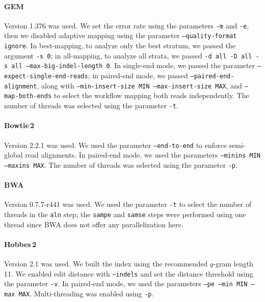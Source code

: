 \paragraph{GEM}
Version 1.376 was used.
We set the error rate using the parameters \texttt{-m} and \texttt{-e}, then we disabled adaptive mapping using the parameter \texttt{--quality-format ignore}.
In best-mapping, to analyze only the best stratum, we passed the argument \texttt{-s 0};
in all-mapping, to analyze all strata, we passed \texttt{-d all -D all -s all --max-big-indel-length 0}.
In single-end mode, we passed the parameter \texttt{--expect-single-end-reads}; in paired-end mode, we passed \texttt{--paired-end-alignment}, along with \texttt{--min-insert-size MIN --max-insert-size MAX}, and \texttt{--map-both-ends} to select the workflow mapping both reads independently.
The number of threads was selected using the parameter \texttt{-t}.

\paragraph{Bowtie\,2}
Version 2.2.1 was used.
We used the parameter \texttt{--end-to-end} to enforce semi-global read alignments.
In paired-end mode, we used the parameters \texttt{--minins MIN --maxins MAX}.
The number of threads was selected using the parameter \texttt{-p}.

\paragraph{BWA}
Version 0.7.7-r441 was used.
We used the parameter \texttt{-t} to select the number of threads in the \texttt{aln} step;
the \texttt{sampe} and \texttt{samse} steps were performed using one thread since BWA does not offer any parallelization here.

\paragraph{Hobbes\,2}
Version 2.1 was used.
We built the index using the recommended $q$-gram length 11.
We enabled edit distance with \texttt{--indels} and set the distance threshold using the parameter \texttt{-v}.
In paired-end mode, we used the parameters \texttt{--pe --min MIN --max MAX}.
Multi-threading was enabled using \texttt{-p}.


